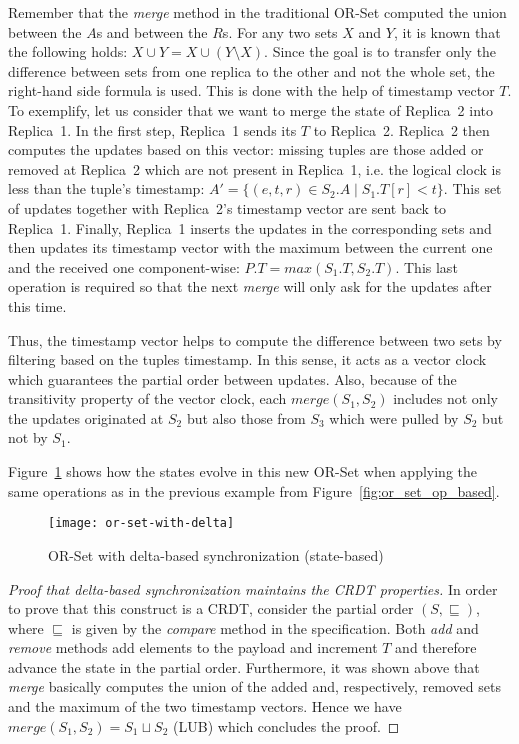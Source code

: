 Remember that the \textit{merge} method in the traditional OR-Set computed the
union between the $A$s and between the $R$s. For any two sets $X$ and $Y$, it is
known that the following holds: $X \cup Y = X \cup (Y \setminus X)$. Since the
goal is to transfer only the difference between sets from one replica to the
other and not the whole set, the right-hand side formula is used. This is done
with the help of timestamp vector $T$. To exemplify, let us consider that we
want to merge the state of Replica~2 into Replica~1. In the first step,
Replica~1 sends its $T$ to Replica~2. Replica~2 then computes the updates based
on this vector: missing tuples are those added or removed at Replica~2 which are
not present in Replica~1, i.e. the logical clock is less than the tuple's
timestamp: $A' = \{(e, t, r) \in S_{2}.A \mid S_{1}.T[r] < t\}$. This set of
updates together with Replica~2's timestamp vector are sent back to Replica~1.
Finally, Replica~1 inserts the updates in the corresponding sets and then
updates its timestamp vector with the maximum between the current one and the
received one component-wise: $P.T = max(S_{1}.T, S_{2}.T)$. This last operation
is required so that the next \textit{merge} will only ask for the updates after
this time.

Thus, the timestamp vector helps to compute the difference between two sets by
filtering based on the tuples timestamp. In this sense, it acts as a vector
clock~\cite{mattern1988virtual} which guarantees the partial order between
updates. Also, because of the transitivity property of the vector clock, each
$\textit{merge}(S_{1}, S_{2})$ includes not only the updates originated at
$S_{2}$ but also those from $S_{3}$ which were pulled by $S_{2}$ but not by
$S_{1}$.

Figure~\ref{fig:or_set_with_delta} shows how the states evolve in this new
OR-Set when applying the same operations as in the previous example from
Figure~\ref{fig:or_set_op_based}.

\begin{figure}[t]
  \centering
  \begin{minipage}{\linewidth}
    \centering
    \texttt{[image: or-set-with-delta]}
    \caption{OR-Set with delta-based synchronization (state-based)}
    \label{fig:or_set_with_delta}
  \end{minipage}
\end{figure}

\begin{proof}[Proof that delta-based synchronization maintains the CRDT
properties] 
In order to prove that this construct is a CRDT, consider the
partial order $(S, \sqsubseteq)$, where $\sqsubseteq$ is given by the
\textit{compare} method in the specification. Both \textit{add} and
\textit{remove} methods add elements to the payload and increment $T$ and
therefore advance the state in the partial order. Furthermore, it was shown
above that \textit{merge} basically computes the union of the added and,
respectively, removed sets and the maximum of the two timestamp vectors. Hence
we have $\textit{merge}(S_{1}, S_{2}) = S_{1} \sqcup S_{2}$ (LUB) which
concludes the proof.
\end{proof}

